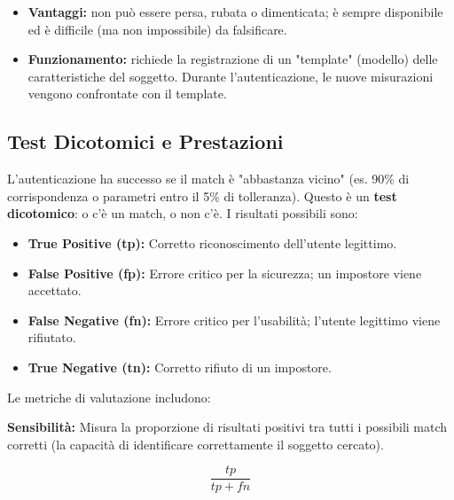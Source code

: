 \documentclass{article}
\begin{document}
\begin{itemize}
    \item \textbf{Vantaggi:} non può essere persa, rubata o dimenticata; è sempre disponibile ed è difficile (ma non impossibile) da falsificare.
    \item \textbf{Funzionamento:} richiede la registrazione di un "template" (modello) delle caratteristiche del soggetto. Durante l'autenticazione, le nuove misurazioni vengono confrontate con il template.
\end{itemize}

\subsection*{Test Dicotomici e Prestazioni}

L'autenticazione ha successo se il match è "abbastanza vicino" (es. 90\% di corrispondenza o parametri entro il 5\% di tolleranza). Questo è un \textbf{test dicotomico}: o c'è un match, o non c'è. I risultati possibili sono:

\begin{itemize}
    \item \textbf{True Positive (tp):} Corretto riconoscimento dell'utente legittimo.
    \item \textbf{False Positive (fp):} Errore critico per la sicurezza; un impostore viene accettato.
    \item \textbf{False Negative (fn):} Errore critico per l'usabilità; l'utente legittimo viene rifiutato.
    \item \textbf{True Negative (tn):} Corretto rifiuto di un impostore.
\end{itemize}

\vspace{0.3cm}
\noindent Le metriche di valutazione includono:

\vspace{0.3cm}
\noindent \begin{minipage}{0.48\textwidth}
    \textbf{Sensibilità:} Misura la proporzione di risultati positivi tra tutti i possibili match corretti (la capacità di identificare correttamente il soggetto cercato).
\end{minipage}
\hfill
\begin{minipage}{0.48\textwidth}
    \begin{equation*}
        \frac{tp}{tp + fn}
    \end{equation*}
\end{minipage}
\end{document}
